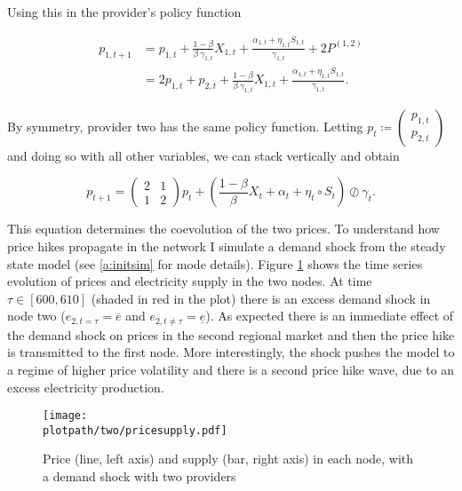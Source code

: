 Using this in the provider's policy function

\begin{equation*}
  \begin{split}
    p_{1, t+1} &= p_{1, t} + \frac{1-\beta}{\beta \ \gamma_{1, t}} X_{1, t} + \frac{\alpha_{1, t} + \eta_{1, t} S_{1, t}}{\gamma_{1, t}} + 2P^{(1, 2)} \\
    &= 2p_{1, t} + p_{2, t} + \frac{1-\beta}{\beta \ \gamma_{1, t}} X_{1, t} + \frac{\alpha_{1, t} + \eta_{1, t} S_{1, t}}{\gamma_{1, t}}.
  \end{split}
\end{equation*}

By symmetry, provider two has the same policy function. Letting $p_t \coloneqq \begin{pmatrix}
    p_{1, t} \\ p_{2, t}
  \end{pmatrix}$ and doing so with all other variables, we can stack vertically and obtain

\begin{equation}
  p_{t+1} = \begin{pmatrix}
    2 & 1 \\
    1 & 2
  \end{pmatrix} p_t + \left( \frac{1-\beta}{\beta} X_t + \alpha_t + \eta_t \circ S_t \right) \oslash \gamma_t.
\end{equation}

This equation determines the coevolution of the two prices. To understand how price hikes propagate in the network I simulate a demand shock from the steady state model (see \ref{a:initsim} for mode details). Figure \ref{fig:two} shows the time series evolution of prices and electricity supply in the two nodes. At time $\tau \in [600, 610]$ (shaded in red in the plot) there is an excess demand shock in node two ($e_{2, t = \tau} = \overline{e}$ and $e_{2, t \neq \tau} = \underline{e}$). As expected there is an immediate effect of the demand shock on prices in the second regional market and then the price hike is transmitted to the first node. More interestingly, the shock pushes the model to a regime of higher price volatility and there is a second price hike wave, due to an excess electricity production.


\begin{figure}[H]
  \centering
  \texttt{[image: \\plotpath/two/pricesupply.pdf]}
  \caption{Price (line, left axis) and supply (bar, right axis) in each node, with a demand shock with two providers} \label{fig:two}
\end{figure}

